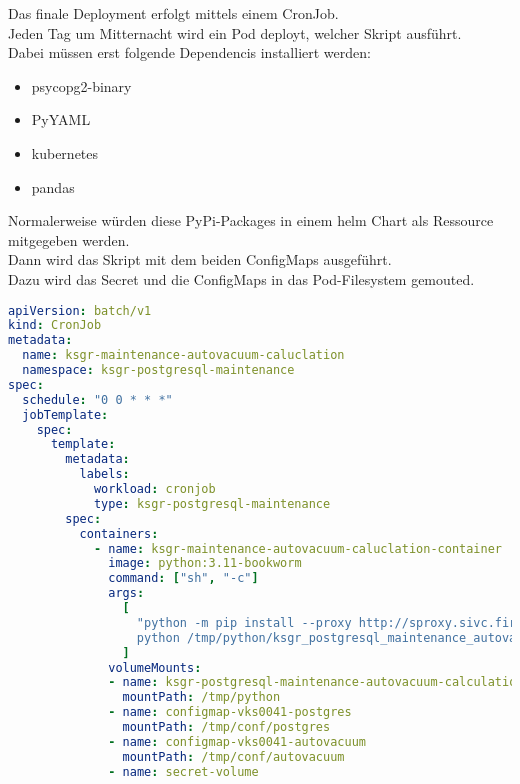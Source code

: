 \begin{flushleft}
    Das finale Deployment erfolgt mittels einem CronJob.\\
    Jeden Tag um Mitternacht wird ein Pod deployt, welcher Skript ausführt.\\
    Dabei müssen erst folgende Dependencis installiert werden:
    \begin{itemize}
        \item psycopg2-binary
        \item PyYAML
        \item kubernetes
        \item pandas
    \end{itemize}
    Normalerweise würden diese PyPi-Packages in einem \gls{helm} Chart als Ressource mitgegeben werden.\\
    Dann wird das Skript mit dem beiden ConfigMaps ausgeführt.\\
    Dazu wird das Secret und die ConfigMaps in das Pod-Filesystem gemouted.
    \lstset{style=gra_codestyle}
    \begin{lstlisting}[language=yaml, caption=Maintenance-Tool - \Gls{AUTOVACUUM} - ksgr-maintenance-autovacuum-caluclation,captionpos=b,label={lst:maintenannce-tool-autovacuum-ksgr-maintenance-autovacuum-caluclation},breaklines=true]
apiVersion: batch/v1
kind: CronJob
metadata:
  name: ksgr-maintenance-autovacuum-caluclation
  namespace: ksgr-postgresql-maintenance
spec:
  schedule: "0 0 * * *"
  jobTemplate:
    spec:
      template:
        metadata:
          labels:
            workload: cronjob
            type: ksgr-postgresql-maintenance
        spec:
          containers:
            - name: ksgr-maintenance-autovacuum-caluclation-container
              image: python:3.11-bookworm
              command: ["sh", "-c"]
              args:
                [
                  "python -m pip install --proxy http://sproxy.sivc.first-it.ch:8080 psycopg2-binary PyYAML kubernetes pandas;
                  python /tmp/python/ksgr_postgresql_maintenance_autovacuum_calculation.py /tmp/conf/postgres/configmap-vks0041-postgres.yaml /tmp/conf/autovacuum/configmap-vks0041-autovacuum.yaml"
                ]
              volumeMounts:
              - name: ksgr-postgresql-maintenance-autovacuum-calculation
                mountPath: /tmp/python
              - name: configmap-vks0041-postgres
                mountPath: /tmp/conf/postgres
              - name: configmap-vks0041-autovacuum
                mountPath: /tmp/conf/autovacuum
              - name: secret-volume

\end{lstlisting}
\end{flushleft}
